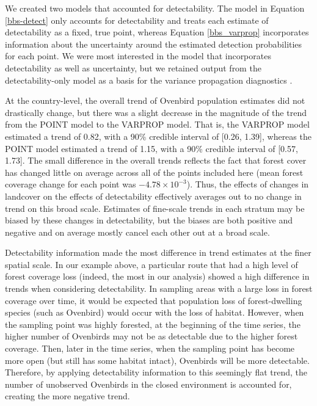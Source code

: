 \par We created two models that accounted for detectability.
The model in Equation \ref{bbs-detect} only accounts for detectability and treats each estimate of detectability as a fixed, true point, whereas Equation \ref{bbs_varprop} incorporates information about the uncertainty around the estimated detection probabilities for each point.
We were most interested in the model that incorporates detectability as well as uncertainty, but we retained output from the detectability-only model as a basis for the variance propagation diagnostics \citep{bravington_variance_2021}.

\par At the country-level, the overall trend of Ovenbird population estimates did not drastically change, but there was a slight decrease in the magnitude of the trend from the POINT model to the VARPROP model.
That is, the VARPROP model estimated a trend of 0.82, with a 90\% credible interval of [0.26, 1.39], whereas the POINT model estimated a trend of 1.15, with a 90\% credible interval of [0.57, 1.73].
The small difference in the overall trends reflects the fact that forest cover has changed little on average across all of the points included here (mean forest coverage change for each point was $-4.78 \times 10^{-3}$).
Thus, the effects of changes in landcover on the effects of detectability effectively averages out to no change in trend on this broad scale.
Estimates of fine-scale trends in each stratum may be biased by these changes in detectability, but the biases are both positive and negative and on average mostly cancel each other out at a broad scale. 

\par Detectability information made the most difference in trend estimates at the finer spatial scale.
In our example above, a particular route that had a high level of forest coverage loss (indeed, the most in our analysis) showed a high difference in trends when considering detectability.
In sampling areas with a large loss in forest coverage over time, it would be expected that population loss of forest-dwelling species (such as Ovenbird) would occur with the loss of habitat.
However, when the sampling point was highly forested, at the beginning of the time series, the higher number of Ovenbirds may not be as detectable due to the higher forest coverage.
Then, later in the time series, when the sampling point has become more open (but still has some habitat intact), Ovenbirds will be more detectable.
Therefore, by applying detectability information to this seemingly flat trend, the number of unobserved Ovenbirds in the closed environment is accounted for, creating the more negative trend.

